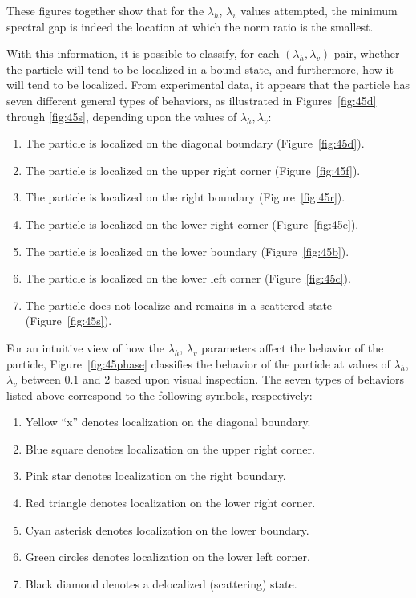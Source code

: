 \documentclass{article}
\numberwithin{equation}{section}
\numberwithin{theorem}{section}
\numberwithin{proposition}{section}
\numberwithin{lemma}{section}
\numberwithin{corollary}{section}
\numberwithin{definition}{section}
\begin{document}
These figures together show that for the $\lambda_h$, $\lambda_v$ values attempted, the minimum spectral gap is indeed the location at which the norm ratio is the smallest.

With this information, it is possible to classify, for each $(\lambda_h, \lambda_v)$ pair, whether the particle will tend to be localized in a bound state, and furthermore, how it will tend to be localized. From experimental data, it appears that the particle has seven different general types of behaviors, as illustrated in Figures~\ref{fig:45d} through \ref{fig:45s}, depending upon the values of $\lambda_h, \lambda_v$:

\begin{enumerate}
	\item The particle is localized on the diagonal boundary (Figure~\ref{fig:45d}).
	\item The particle is localized on the upper right corner (Figure~\ref{fig:45f}).
	\item The particle is localized on the right boundary (Figure~\ref{fig:45r}).
	\item The particle is localized on the lower right corner (Figure~\ref{fig:45e}).
	\item The particle is localized on the lower boundary (Figure~\ref{fig:45b}).
	\item The particle is localized on the lower left corner (Figure~\ref{fig:45c}).
	\item The particle does not localize and remains in a scattered state (Figure~\ref{fig:45s}).
\end{enumerate}

For an intuitive view of how the $\lambda_h$, $\lambda_v$ parameters affect the behavior of the particle, Figure~\ref{fig:45phase} classifies the behavior of the particle at values of $\lambda_h$, $\lambda_v$ between $0.1$ and $2$ based upon visual inspection. The seven types of behaviors listed above correspond to the following symbols, respectively:
\begin{enumerate}
	\item Yellow ``x'' denotes localization on the diagonal boundary.
	\item Blue square denotes localization on the upper right corner.
	\item Pink star denotes localization on the right boundary.
	\item Red triangle denotes localization on the lower right corner.
	\item Cyan asterisk denotes localization on the lower boundary.
	\item Green circles denotes localization on the lower left corner.
	\item Black diamond denotes a delocalized (scattering) state.
\end{enumerate}
\end{document}
